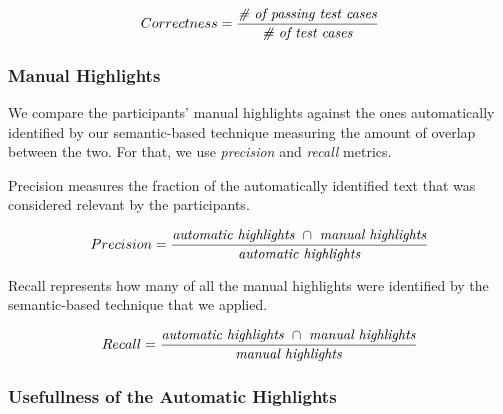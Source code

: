 {\smallskip
\begin{small}


\begin{equation}
    Correctness = \frac{ \text{\textit{\# of passing test cases}}}{\text{\textit{\#  of test cases}}}
\end{equation}
\end{small}



\subsubsection{Manual Highlights}


We compare the participants' manual highlights  against the ones automatically identified by our semantic-based technique measuring the amount of overlap between the two. 
For that, we use \textit{precision} and \textit{recall} metrics. 




Precision measures the fraction of the automatically identified text that was  considered relevant
by the participants.

\smallskip
\begin{small}


\begin{equation}
    Precision = \frac{
        \text{\textit{automatic highlights}~} \cap 
        \text{~\textit{manual highlights}}
    }{\text{\textit{automatic highlights}}}
\end{equation}
\end{small}


Recall represents how many of all the manual highlights were identified by the semantic-based technique that we applied.

\smallskip
\begin{small}

\begin{equation}
    Recall = \frac{
        \text{\textit{automatic highlights}~} \cap 
        \text{~\textit{manual highlights}}
    }{\text{\textit{manual highlights}}}
\end{equation}
\end{small}

\medskip
{}




\subsubsection{Usefullness of the Automatic Highlights}


}
